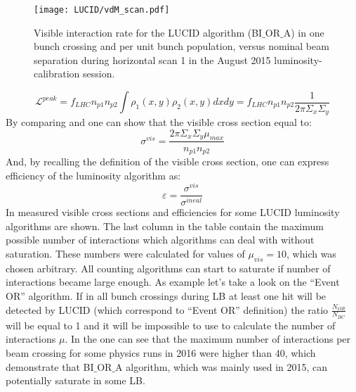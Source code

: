 \begin{figure}
\centering
\texttt{[image: LUCID/vdM\_scan.pdf]}
\caption{Visible interaction rate for the LUCID algorithm (BI$\_$OR$\_$A) in one bunch crossing and per unit bunch population, 
	 versus nominal beam separation during horizontal scan 1 in the August 2015 luminosity-calibration session. }
\label{fig:vdmScanCurve}
\end{figure}
\begin{equation}
\mathscr{L}^{peak} = f_{LHC} n_{p1} n_{p2} \int \rho_{1}(x,y) \rho_{2}(x,y) dx dy =  f_{LHC} n_{p1} n_{p2} \dfrac{1}{2\pi \Sigma_{x} \Sigma_{y}}
\label{eq:lumi_vdm}
\end{equation}
By comparing  and  one can show that the visible cross section equal to:
\begin{equation}
\sigma^{vis} = \dfrac{ 2 \pi \Sigma_{x} \Sigma_{y} \mu_{max}  }{ n_{p1} n_{p2} }
\label{eq:sigma_vis}
\end{equation}
And, by recalling the definition of the visible cross section, one can express efficiency of the luminosity algorithm as:
\begin{equation}
\varepsilon = \dfrac{\sigma^{vis}}{\sigma^{ineal}}
\label{eq:alg_method_eff}
\end{equation}
In  measured visible cross sections and efficiencies for some LUCID luminosity algorithms are shown.
The last column in the table contain the maximum possible number of interactions which algorithms can deal with without saturation.
These numbers were calculated for values of $\mu_{vis} = 10$, which was chosen arbitrary.
All counting algorithms can start to saturate if number of interactions became large enough. As example let's take a look on the ``Event OR'' algorithm.
If in all bunch crossings during LB at least one hit will be detected by LUCID (which correspond to ``Event OR'' definition) 
the ratio $\frac{N_{OR}}{N_{BC}}$ will be equal to 1 and it will be impossible to use  to calculate 
the number of interactions $\mu$. In the  one can see that the maximum number of interactions per beam crossing 
for some physics runs in 2016 were higher than 40, which demonstrate that BI$\_$OR$\_$A algorithm, which was mainly used in 2015, can potentially saturate in some LB.


